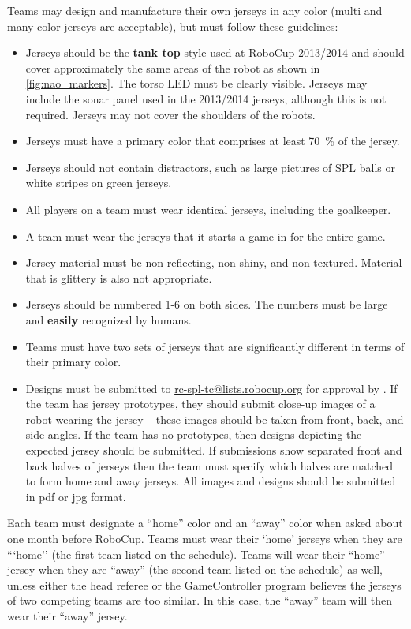 Teams may design and manufacture their own jerseys in any color (multi and many color jerseys are acceptable), but must follow these guidelines:
\begin{itemize}
\item Jerseys should be the \textbf{tank top} style used at RoboCup 2013/2014 and should cover approximately the same areas of the robot as shown in \cref{fig:nao_markers}. The torso LED must be clearly visible. Jerseys may include the sonar panel used in the 2013/2014 jerseys, although this is not required. Jerseys may not cover the shoulders of the robots.
\item Jerseys must have a primary color that comprises at least \qty{70}{\percent} of the jersey.
\item Jerseys should not contain distractors, such as large pictures of SPL balls or white stripes on green jerseys.
\item All players on a team must wear identical jerseys, including the goalkeeper.
\item A team must wear the jerseys that it starts a game in for the entire game.
\item Jersey material must be non-reflecting, non-shiny, and non-textured.  Material that is glittery is also not appropriate.
\item Jerseys should be numbered 1-6 on both sides.  The numbers must be large and {\bf easily} recognized by humans.
\item Teams must have two sets of jerseys that are significantly different in terms of their primary color.
\item Designs must be submitted to \url{rc-spl-tc@lists.robocup.org} for approval by \DTMdate{\JerseyApproveSubmissionDate}. If the team has jersey prototypes, they should submit close-up images of a robot wearing the jersey -- these images should be taken from front, back, and side angles.  If the team has no prototypes, then designs depicting the expected jersey should be submitted.  If submissions show separated front and back halves of jerseys then the team must specify which halves are matched to form home and away jerseys.  All images and designs should be submitted in pdf or jpg format.
\end{itemize}

Each team must designate a ``home'' color and an ``away'' color when asked about one month before RoboCup. Teams must wear their `home' jerseys when they are ```home'' (the first team listed on the schedule). Teams will wear their ``home'' jersey when they are ``away'' (the second team listed on the schedule) as well, unless either the head referee or the GameController program believes the jerseys of two competing teams are too similar.  In this case, the ``away'' team will then wear their ``away'' jersey.

